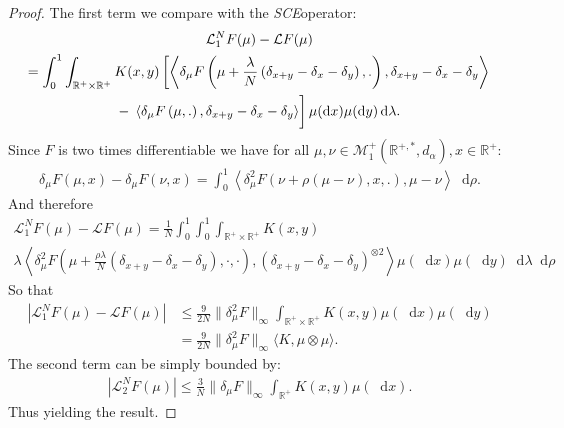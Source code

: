 \documentclass[11pt,a4paper]{article}
\newcommand{\RR}{\mathbb{R}}
\newcommand{\MC}{\mathcal{M}}
\newcommand{\LC}{\mathcal{L}}
\newcommand{\SCE}{\emph{SCE}}
\newcommand{\dd}{\mathop{}\!\mathrm{d}}
\begin{document}
\begin{proof}
    The first term we compare with the \SCE operator:
    \begin{multline*}
        \LC_1^N F(\mu) - \LC F(\mu) \\
        = \int_0^1 \int_{\RR^+ \times \RR^+} K(x,y)\left[ \left\langle  \delta_\mu F\left(\mu + \frac{\lambda}{N}\left(\delta_{x + y} - \delta_x - \delta_y \right),.\right),\delta_{x+y} - \delta_x - \delta_y\right\rangle  \right.\\
        -\left.\vphantom{\left\langle  \delta_\mu F\left(\mu + \frac{\lambda}{N}\left(\delta_{x + y} - \delta_x - \delta_y \right),.\right),\delta_{x+y} - \delta_x - \delta_y\right\rangle}
        \left\langle  \delta_\mu F\left(\mu,.\right),\delta_{x+y} - \delta_x - \delta_y\right\rangle\right]\mu(\dd x)\mu(\dd y)\dd\lambda .
    \end{multline*}
    Since $F$ is two times differentiable we have for all $\mu,\nu \in \MC^+_1\left(\RR^{+,*},d_\alpha\right) , x \in \RR^+$:
    \begin{align*}
        \delta_\mu F\left(\mu,x \right) - \delta_\mu F\left(\nu,x \right)
        = \int_0^1 \left\langle\delta^2_\mu F\left(\nu + \rho\left(\mu - \nu \right),x,. \right),\mu - \nu  \right\rangle \dd\rho .
    \end{align*}
    And therefore
    \begin{multline*}
        \LC_1^N F(\mu) - \LC F(\mu) 
        = \frac{1}{N}\int_0^1 \int_0^1 \int_{\RR^+ \times \RR^+} K(x,y) \\
        \lambda\left\langle  \delta^2_\mu F\left(\mu + \frac{\rho\lambda}{N}\left(\delta_{x + y} - \delta_x - \delta_y \right),\cdot,\cdot\right),\left(\delta_{x+y} - \delta_x - \delta_y\right)^{\otimes 2}\right\rangle \mu(\dd x)\mu(\dd y)\dd \lambda \dd \rho 
    \end{multline*}
    So that
    \begin{align*}
        \left| \LC_1^N F(\mu) - \LC F(\mu) \right| 
        &\leq \frac{9}{2N}\|\delta_\mu^2 F\|_{\infty} \int_{\RR^+ \times \RR^+} K(x,y)\mu(\dd x)\mu(\dd y)\\
        &= \frac{9}{2N}\|\delta_\mu^2 F\|_{\infty}\langle K,\mu\otimes\mu\rangle.
    \end{align*}
    The second term can be simply bounded by:
    \begin{align*}
        \left|\LC_2^N F(\mu) \right| \leq \frac{3}{N}\|\delta_\mu F\|_{\infty}\int_{\RR^+} K(x,y)\mu(\dd x).
    \end{align*}
    Thus yielding the result.
\end{proof}
\end{document}
